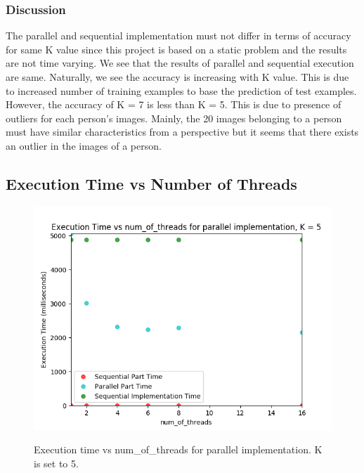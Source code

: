 \documentclass{article}
\begin{document}
\subsubsection{Discussion}
\qquad The parallel and sequential implementation must not differ in terms of accuracy for same K value since this project is based on a static problem and the results are not time varying. We see that the results of parallel and sequential execution are same. Naturally, we see the accuracy is increasing with K value. This is due to increased number of training examples to base the prediction of test examples. However, the accuracy of K = 7 is less than  K = 5. This is due to presence of outliers for each person's images. Mainly, the 20 images belonging to a person must have similar characteristics from a perspective but it seems that there exists an outlier in the images of a person.


\subsection{Execution Time vs Number of Threads}
\begin{figure}[H]
\centering
\includegraphics[width=\linewidth]{assets/time_vs_num_of_threads_parallel_K_5.png}
\label{fig:test1}
\vspace{-2pt}
\caption{Execution time vs num\_of\_threads for parallel implementation. K is set to 5.}
\end{figure}
\end{document}
